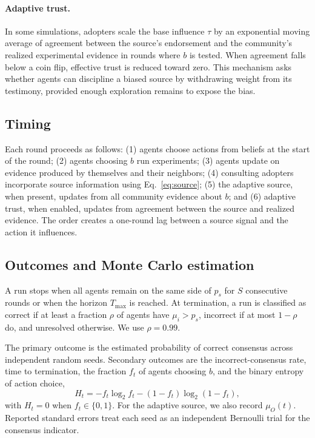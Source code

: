 \documentclass[10pt,letterpaper,twocolumn]{article}
\begin{document}
\paragraph{Adaptive trust.}
In some simulations, adopters scale the base influence $\tau$ by an exponential moving average of agreement between the source's endorsement and the community's realized experimental evidence in rounds where $b$ is tested. When agreement falls below a coin flip, effective trust is reduced toward zero. This mechanism asks whether agents can discipline a biased source by withdrawing weight from its testimony, provided enough exploration remains to expose the bias.

\subsection{Timing}
\label{sec:timing}

Each round proceeds as follows: (1) agents choose actions from beliefs at the start of the round; (2) agents choosing $b$ run experiments; (3) agents update on evidence produced by themselves and their neighbors; (4) consulting adopters incorporate source information using Eq.~\eqref{eq:source}; (5) the adaptive source, when present, updates from all community evidence about $b$; and (6) adaptive trust, when enabled, updates from agreement between the source and realized evidence. The order creates a one-round lag between a source signal and the action it influences.

\subsection{Outcomes and Monte Carlo estimation}
\label{sec:outcomes}

A run stops when all agents remain on the same side of $p_s$ for $S$ consecutive rounds or when the horizon $T_{\max}$ is reached. At termination, a run is classified as correct if at least a fraction $\rho$ of agents have $\mu_i>p_s$, incorrect if at most $1-\rho$ do, and unresolved otherwise. We use $\rho=0.99$.

The primary outcome is the estimated probability of correct consensus across independent random seeds. Secondary outcomes are the incorrect-consensus rate, time to termination, the fraction $f_t$ of agents choosing $b$, and the binary entropy of action choice,
\begin{equation}
  H_t=-f_t\log_2f_t-(1-f_t)\log_2(1-f_t),
\end{equation}
with $H_t=0$ when $f_t\in\{0,1\}$. For the adaptive source, we also record $\mu_O(t)$. Reported standard errors treat each seed as an independent Bernoulli trial for the consensus indicator.
\end{document}
